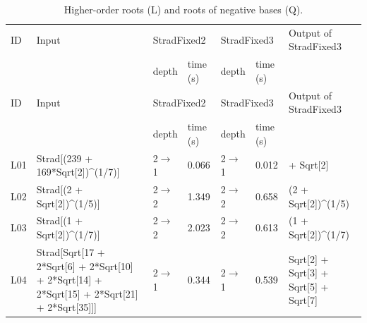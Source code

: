\begin{longtable}{@{}p{}>{\ttfamily\footnotesize\raggedright\arraybackslash}p{}p{}p{}p{}p{}>{\ttfamily\footnotesize\raggedright\arraybackslash}p{}@{}}
\caption{Higher-order roots (L) and roots of negative bases (Q).}\label{tab:cmpLQ}\\
\toprule ID & Input & \multicolumn{2}{l}{StradFixed2} & \multicolumn{2}{l}{StradFixed3} & Output of StradFixed3\\ & & depth & time (s) & depth & time (s) & \\\midrule\endfirsthead
\toprule ID & Input & \multicolumn{2}{l}{StradFixed2} & \multicolumn{2}{l}{StradFixed3} & Output of StradFixed3\\ & & depth & time (s) & depth & time (s) & \\\midrule\endhead
\bottomrule\endfoot
L01 & Strad[\allowbreak{}(\allowbreak{}239 +\allowbreak{} 169*\allowbreak{}Sqrt[\allowbreak{}2]\allowbreak{})\allowbreak{}\textasciicircum{}\allowbreak{}(\allowbreak{}1/\allowbreak{}7)\allowbreak{}]\allowbreak{} & 2$\to$1 & 0.066 & 2$\to$1 & 0.012 & 1 +\allowbreak{} Sqrt[\allowbreak{}2]\allowbreak{}\\
L02 & Strad[\allowbreak{}(\allowbreak{}2 +\allowbreak{} Sqrt[\allowbreak{}2]\allowbreak{})\allowbreak{}\textasciicircum{}\allowbreak{}(\allowbreak{}1/\allowbreak{}5)\allowbreak{}]\allowbreak{} & 2$\to$2 & 1.349 & 2$\to$2 & 0.658 & (\allowbreak{}2 +\allowbreak{} Sqrt[\allowbreak{}2]\allowbreak{})\allowbreak{}\textasciicircum{}\allowbreak{}(\allowbreak{}1/\allowbreak{}5)\allowbreak{}\\
L03 & Strad[\allowbreak{}(\allowbreak{}1 +\allowbreak{} Sqrt[\allowbreak{}2]\allowbreak{})\allowbreak{}\textasciicircum{}\allowbreak{}(\allowbreak{}1/\allowbreak{}7)\allowbreak{}]\allowbreak{} & 2$\to$2 & 2.023 & 2$\to$2 & 0.613 & (\allowbreak{}1 +\allowbreak{} Sqrt[\allowbreak{}2]\allowbreak{})\allowbreak{}\textasciicircum{}\allowbreak{}(\allowbreak{}1/\allowbreak{}7)\allowbreak{}\\
L04 & Strad[\allowbreak{}Sqrt[\allowbreak{}17 +\allowbreak{} 2*\allowbreak{}Sqrt[\allowbreak{}6]\allowbreak{} +\allowbreak{} 2*\allowbreak{}Sqrt[\allowbreak{}10]\allowbreak{} +\allowbreak{} 2*\allowbreak{}Sqrt[\allowbreak{}14]\allowbreak{} +\allowbreak{} 2*\allowbreak{}Sqrt[\allowbreak{}15]\allowbreak{} +\allowbreak{} 2*\allowbreak{}Sqrt[\allowbreak{}21]\allowbreak{} +\allowbreak{} 2*\allowbreak{}Sqrt[\allowbreak{}35]\allowbreak{}]\allowbreak{}]\allowbreak{} & 2$\to$1 & 0.344 & 2$\to$1 & 0.539 & Sqrt[\allowbreak{}2]\allowbreak{} +\allowbreak{} Sqrt[\allowbreak{}3]\allowbreak{} +\allowbreak{} Sqrt[\allowbreak{}5]\allowbreak{} +\allowbreak{} Sqrt[\allowbreak{}7]\allowbreak{}\\

\end{longtable}
